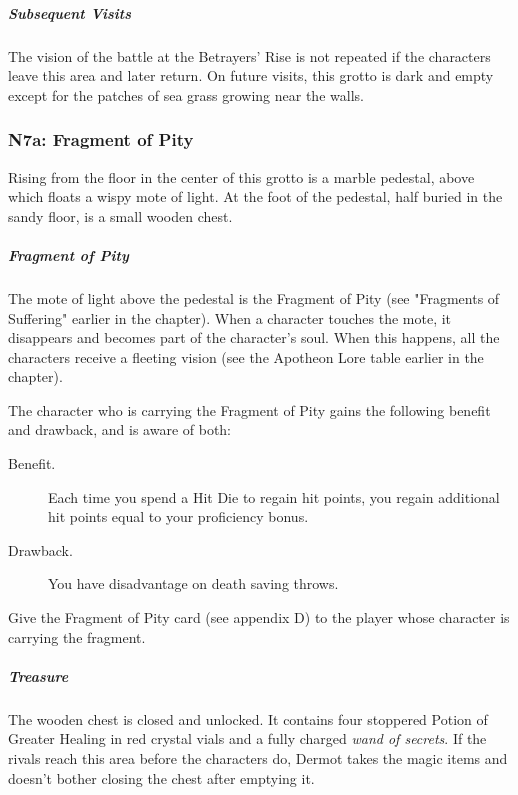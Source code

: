 \documentclass[10pt,a4paper,twoside,bg=print,twocolumn,openany,nodeprecatedcode]{dndbook}
\begin{document}
\subparagraph{Subsequent Visits}
The vision of the battle at the Betrayers' Rise is not repeated if the characters leave this area and later return. On future visits, this grotto is dark and empty except for the patches of sea grass growing near the walls.

\subsubsection{N7a: Fragment of Pity}
\begin{DndReadAloud}{}
Rising from the floor in the center of this grotto is a marble pedestal, above which floats a wispy mote of light. At the foot of the pedestal, half buried in the sandy floor, is a small wooden chest.

\end{DndReadAloud}

\subparagraph{Fragment of Pity}
The mote of light above the pedestal is the Fragment of Pity (see "Fragments of Suffering" earlier in the chapter). When a character touches the mote, it disappears and becomes part of the character's soul. When this happens, all the characters receive a fleeting vision (see the Apotheon Lore table earlier in the chapter).

The character who is carrying the Fragment of Pity gains the following benefit and drawback, and is aware of both:

\begin{DndSidebar}[float=!b]{}

\begin{description}
\item[Benefit.]
Each time you spend a Hit Die to regain hit points, you regain additional hit points equal to your proficiency bonus.
\item[Drawback.]
You have disadvantage on death saving throws.
\end{description}



\end{DndSidebar}

Give the Fragment of Pity card (see appendix D) to the player whose character is carrying the fragment.

\subparagraph{Treasure}
The wooden chest is closed and unlocked. It contains four stoppered Potion of Greater Healing in red crystal vials and a fully charged \textit{wand of secrets}. If the rivals reach this area before the characters do, Dermot takes the magic items and doesn't bother closing the chest after emptying it.
\end{document}
